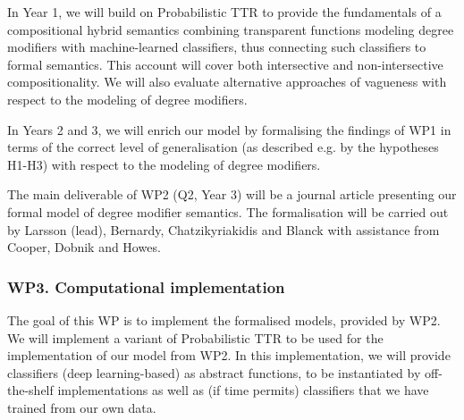 \documentclass[11pt,a4paper]{article}
\newcommand{\people}[1]{}
\newcommand{\comment}[1]{{\footnotesize\textsc{#1}}}
\begin{document}



In Year 1, we will build on Probabilistic TTR to provide the fundamentals of a compositional hybrid semantics combining transparent functions modeling degree modifiers with machine-learned classifiers, %
thus %
connecting such classifiers to formal semantics. This account will cover both intersective and non-intersective compositionality. We will also evaluate alternative approaches of vagueness with respect to the modeling of degree modifiers.%

In Years 2 and 3, we will enrich our model by formalising the findings of WP1 in terms of the correct level of generalisation (as described e.g. by the hypotheses H1-H3) with respect to the modeling of degree modifiers. 

The main deliverable of WP2 (Q2, Year 3) will be a journal article presenting our formal model of degree modifier semantics.  The formalisation will be carried out by Larsson (lead), Bernardy,  Chatzikyriakidis and Blanck  with assistance from Cooper,  Dobnik and Howes.




\subsubsection*{WP3. Computational implementation}

\people{jean-philippe, simon?, mehdi,  Staffan, additional programmer?}

The goal of this WP is to implement the formalised models, provided by WP2.  We will implement a variant of Probabilistic TTR to be used for the implementation of our model from WP2. %
In this implementation, we will provide classifiers (deep learning-based) as abstract functions, to be instantiated by off-the-shelf implementations as well as (if time permits) classifiers that we have trained from our own data.
\end{document}
